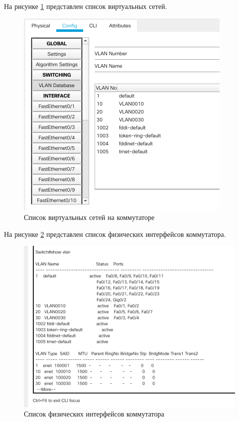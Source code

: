 \documentclass[12pt]{report}
\begin{document}
На рисунке \ref{fig:3} представлен список виртуальных сетей.

\begin{figure}[H]
	\begin{center}
		\includegraphics[scale=0.7]{img/3.png}
	\end{center}
	\caption{Список виртуальных сетей на коммутаторе}
	\label{fig:3}
\end{figure}

На рисунке \ref{fig:4} представлен список физических интерфейсов коммутатора.

\begin{figure}[H]
	\begin{center}
		\includegraphics[scale=0.7]{img/4.png}
	\end{center}
	\caption{Список физических интерфейсов коммутатора}
	\label{fig:4}
\end{figure}
\end{document}
